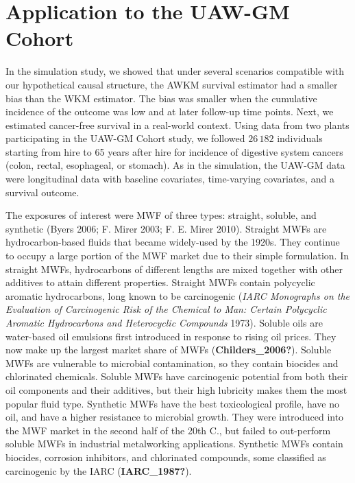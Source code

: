 \documentclass[
  11pt,
]{article}
\begin{document}
\hypertarget{application-to-the-uaw-gm-cohort}{%
\section{Application to the UAW-GM
Cohort}\label{application-to-the-uaw-gm-cohort}}

In the simulation study, we showed that under several scenarios
compatible with our hypothetical causal structure, the AWKM survival
estimator had a smaller bias than the WKM estimator. The bias was
smaller when the cumulative incidence of the outcome was low and at
later follow-up time points. Next, we estimated cancer-free survival in
a real-world context. Using data from two plants participating in the
UAW-GM Cohort study, we followed \(26\,182\) individuals starting from
hire to 65 years after hire for incidence of digestive system cancers
(colon, rectal, esophageal, or stomach). As in the simulation, the
UAW-GM data were longitudinal data with baseline covariates,
time-varying covariates, and a survival outcome.

The exposures of interest were MWF of three types: straight, soluble,
and synthetic (Byers 2006; F. Mirer 2003; F. E. Mirer 2010). Straight
MWFs are hydrocarbon-based fluids that became widely-used by the 1920s.
They continue to occupy a large portion of the MWF market due to their
simple formulation. In straight MWFs, hydrocarbons of different lengths
are mixed together with other additives to attain different properties.
Straight MWFs contain polycyclic aromatic hydrocarbons, long known to be
carcinogenic (\emph{IARC Monographs on the Evaluation of Carcinogenic
Risk of the Chemical to Man: Certain Polycyclic Aromatic Hydrocarbons
and Heterocyclic Compounds} 1973). Soluble oils are water-based oil
emulsions first introduced in response to rising oil prices. They now
make up the largest market share of MWFs (\textbf{Childers\_2006?}).
Soluble MWFs are vulnerable to microbial contamination, so they contain
biocides and chlorinated chemicals. Soluble MWFs have carcinogenic
potential from both their oil components and their additives, but their
high lubricity makes them the most popular fluid type. Synthetic MWFs
have the best toxicological profile, have no oil, and have a higher
resistance to microbial growth. They were introduced into the MWF market
in the second half of the 20th C., but failed to out-perform soluble
MWFs in industrial metalworking applications. Synthetic MWFs contain
biocides, corrosion inhibitors, and chlorinated compounds, some
classified as carcinogenic by the IARC (\textbf{IARC\_1987?}).
\end{document}
